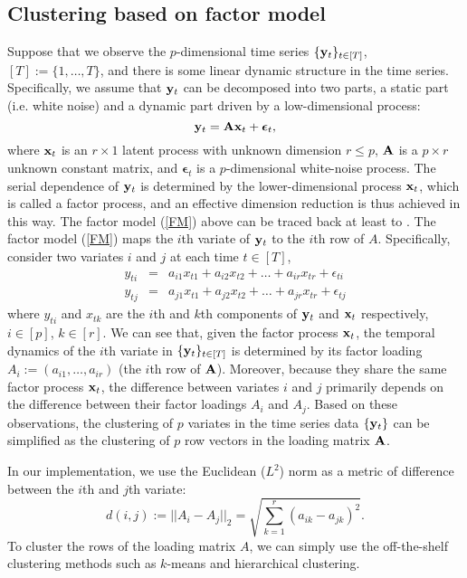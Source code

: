 \documentclass{article} %
\begin{document}
\subsection{Clustering based on factor model}
Suppose that we observe the $p$-dimensional time series $\{{\bf y}_t\}_{t\in[T]}$, $[T]:=\{1,\ldots,T\}$, and there is some linear dynamic structure in the time series. Specifically, we assume that ${\bf y}_t$ can be decomposed into two parts, a static part (i.e. white noise) and a dynamic part driven by a low-dimensional process:
\begin{equation}\label{FM}
{\bf y}_t={\bf A}{\bf x}_t+{\bm\epsilon}_t,
\end{equation}
where ${\bf x}_t$ is an $r\times 1$ latent process with unknown dimension $r\leq p$, $\bf A$ is a $p\times r$ unknown constant matrix, and ${\bm \epsilon}_t$ is a $p$-dimensional white-noise process. The serial dependence of ${\bf y}_t$ is determined by the lower-dimensional process ${\bf x}_t$, which is called a factor process, and an effective dimension reduction is thus achieved in this way. The factor model (\ref{FM}) above can be traced back at least to \cite{pb_fm87}. The factor model (\ref{FM}) maps the $i$th variate of ${\bf y}_t$ to the $i$th row of $A$. Specifically, consider two variates $i$ and $j$ at each time $t\in[T]$,
\begin{eqnarray}
y_{ti}&=& a_{i1}x_{t1}+a_{i2}x_{t2}+\ldots +a_{ir}x_{tr}+\epsilon_{ti}\nonumber\\
y_{tj}&=& a_{j1}x_{t1}+a_{j2}x_{t2}+\ldots +a_{jr}x_{tr}+\epsilon_{tj}\nonumber
\end{eqnarray}
where $y_{ti}$ and $x_{tk}$ are the $i$th and $k$th components of ${\bf y}_t$ and ${\bf x}_t$ respectively, $i\in[p]$, $k\in[r]$. We can see that, given the factor process ${\bf x}_t$, the temporal dynamics of the $i$th variate in $\{{\bf y}_t\}_{t\in[T]}$ is determined by its factor loading $A_i:=(a_{i1},\ldots ,a_{ir})$ (the $i$th row of $\bf A$). Moreover, because they share the same factor process ${\bf x}_t$, the difference between variates $i$ and $j$ primarily depends on the difference between their factor loadings $A_i$ and $A_j$. Based on these observations, the clustering of $p$ variates in the time series data $\{{\bf y}_t\}$ can be simplified as the clustering of $p$ row vectors in the loading matrix $\bf A$. 

In our implementation, we use the Euclidean ($L^2$) norm as a metric of difference between the $i$th and $j$th variate:
\[d(i,j):=||A_i-A_j||_2=\sqrt{\sum_{k=1}^r(a_{ik}-a_{jk})^2}.\]
To cluster the rows of the loading matrix $A$, we can simply use the off-the-shelf clustering methods such as $k$-means and hierarchical clustering. 
  
\end{document}
